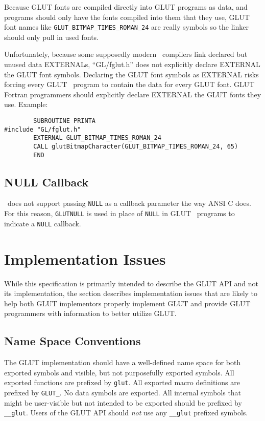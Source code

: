 Because GLUT fonts are compiled directly into GLUT programs as data,
and programs should only have the fonts compiled into them that they use,
GLUT font names like {\tt GLUT\_BITMAP\_TIMES\_ROMAN\_24} are really
symbols so the linker should only pull in used fonts.

Unfortunately, because some supposedly modern \Fortran\ compilers
link declared but unused data EXTERNALs, ``GL/fglut.h'' does not
explicitly declare EXTERNAL the GLUT font symbols.  Declaring the
GLUT font symbols as 
EXTERNAL risks forcing every GLUT \Fortran\
program to contain the data for every GLUT font.  GLUT
Fortran programmers should explicitly declare EXTERNAL
the GLUT fonts they use.  Example:
\begin{verbatim}
        SUBROUTINE PRINTA
#include "GL/fglut.h"
        EXTERNAL GLUT_BITMAP_TIMES_ROMAN_24
        CALL glutBitmapCharacter(GLUT_BITMAP_TIMES_ROMAN_24, 65)
        END
\end{verbatim}

\subsection{NULL Callback}

\Fortran\ does not support passing {\tt NULL} as a callback
parameter the way ANSI C does.  For this reason, {\tt GLUTNULL}
is used in place of {\tt NULL} in GLUT \Fortran\ programs to
indicate a {\tt NULL} callback.

\section{Implementation Issues}

While this specification is primarily intended to describe the GLUT API
and not its implementation, the section describes implementation
issues that are likely to help both GLUT implementors properly
implement GLUT and provide GLUT programmers with information to better
utilize GLUT.

\subsection{Name Space Conventions}

The GLUT implementation should have a well-defined name space for both
exported symbols and visible, but not purposefully exported symbols.
All exported functions are prefixed by {\tt glut}.  All exported macro
definitions are prefixed by {\tt GLUT\_}.  No data symbols are
exported.  All internal symbols that might be user-visible but not
intended to be exported should be prefixed by {\tt \_\_glut}.  Users of
the GLUT API should {\em not} use any {\tt \_\_glut} prefixed symbols.

